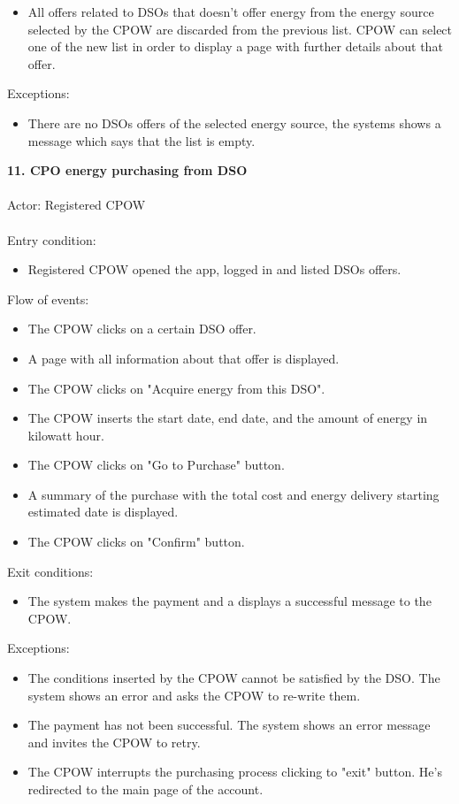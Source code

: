 \documentclass[a4paper]{report}
\begin{document}
\begin{itemize}
\item All offers related to DSOs that doesn't offer energy from the energy source selected by the CPOW are discarded from the previous list. CPOW can select one of the new list in order to display a page with further details about that offer.
\end{itemize} 
Exceptions: 
\begin{itemize}
\item There are no DSOs offers of the selected energy source, the systems shows a message which says that the list is empty.
\end{itemize}
\textbf{11. CPO energy purchasing from DSO}\label{uc:8}
\\ \\
Actor: Registered CPOW \\ \\
Entry condition: 
\begin{itemize}
\item Registered CPOW opened the app, logged in and listed DSOs offers.
\end{itemize}
Flow of events:
\begin{itemize}
\item The CPOW clicks on a certain DSO offer.
\item A page with all information about that offer is displayed.
\item The CPOW clicks on "Acquire energy from this DSO".
\item The CPOW inserts the start date, end date, and the amount of energy in kilowatt hour.
\item The CPOW clicks on "Go to Purchase" button.
\item A summary of the purchase with the total cost and energy delivery starting estimated date is displayed.
\item The CPOW clicks on "Confirm" button.
\end{itemize}
Exit conditions: 
\begin{itemize}
\item The system makes the payment and a displays a successful message to the CPOW. 
\end{itemize} 
Exceptions: 
\begin{itemize}
\item The conditions inserted by the CPOW cannot be satisfied by the DSO. The system shows an error and asks the CPOW to re-write them.
\item The payment has not been successful. The system shows an error message and invites the CPOW to retry.
\item The CPOW interrupts the purchasing process clicking to "exit" button. He's redirected to the main page of the account.
\end{itemize}
\end{document}

